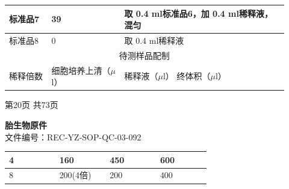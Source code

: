 \documentclass[UTF8,10pt,a4paper,fontset=fandol]{ctexart}
\newcommand{\fieldvalue}[1]{#1}
\newcommand{\handwritten}[1]{#1}
\begin{document}
\begin{tabular}{|p{0.14\linewidth}|p{0.24\linewidth}|p{0.54\linewidth}|}
\hline
标准品7 & 39 &
取
\fieldvalue{\handwritten{0.4}}
ml标准品6，加
\fieldvalue{\handwritten{0.4}}
ml稀释液，混匀 \\
\hline
标准品8 & 0 &
取
\fieldvalue{\handwritten{0.4}}
ml稀释液 \\
\hline
\multicolumn{3}{|c|}{待测样品配制} \\
\hline
稀释倍数 & 细胞培养上清（$\mu$l） & 稀释液（$\mu$l） \quad 终体积（$\mu$l） \\
\hline
\end{tabular}

\hfill 第20页 共73页

\newpage

\begin{center}
\textbf{胎生物原件}\\
文件编号：REC-YZ-SOP-QC-03-092
\end{center}

\begin{center}
\begin{tabular}{|p{0.20\linewidth}|p{0.20\linewidth}|p{0.20\linewidth}|p{0.20\linewidth}|}
\hline
\fieldvalue{\handwritten{4}} &
\fieldvalue{\handwritten{160}} &
\fieldvalue{\handwritten{450}} &
\fieldvalue{\handwritten{600}} \\ \hline
\fieldvalue{\handwritten{8}} &
\fieldvalue{\handwritten{200(4倍)}} &
\fieldvalue{\handwritten{200}} &
\fieldvalue{\handwritten{400}} \\ \hline
\end{tabular}
\end{center}
\end{document}
